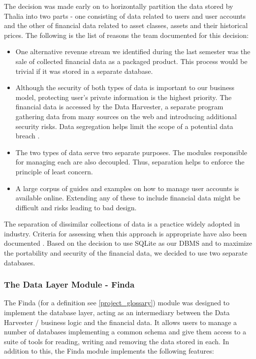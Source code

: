 \documentclass[main.tex]{subfiles}
\begin{document}
The decision was made early on to horizontally partition the data stored by Thalia into two parts - one consisting of data related to users and user accounts and the other of financial data related to asset classes, assets and their historical prices. The following is the list of reasons the team documented for this decision:

\begin{itemize}

\item One alternative revenue stream we identified during the last semester was the sale of collected financial data as a packaged product. This process would be trivial if it was stored in a separate database. 
\item Although the security of both types of data is important to our business model, protecting user’s private information is the highest priority. The financial data is accessed by the Data Harvester, a separate program gathering data from many sources on the web and introducing additional security risks. Data segregation helps limit the scope of a potential data breach \cite{ciscoSeg}.
\item The two types of data serve two separate purposes. The modules responsible for managing each are also decoupled. Thus, separation helps to enforce the principle of least concern.
\item A large corpus of guides and examples on how to manage user accounts is available online. Extending any of these to include financial data might be difficult and risks leading to bad design.

\end{itemize}

The separation of dissimilar collections of data is a practice widely adopted in industry. Criteria for assessing when this approach is appropriate have also been documented \cite{dataSegImp}. Based on the decision to use SQLite as our DBMS and to maximize the portability and security of the financial data, we decided to use two separate databases.

\subsubsection{The Data Layer Module - Finda}

The Finda (for a definition see \ref{project_glossary}) module was designed to implement the database layer, acting as an intermediary between the Data Harvester / business logic and the financial data. It allows users to manage a number of databases implementing a common schema and give them access to a suite of tools for reading, writing and removing the data stored in each. In addition to this, the Finda module implements the following features:
\end{document}
